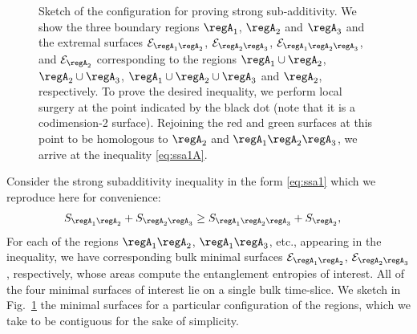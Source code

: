\documentclass[12pt,openany]{book}
\begin{document}
\begin{figure}[htbp]
\begin{center}
\end{center}
\caption{Sketch of  the configuration for proving strong sub-additivity. We show the three boundary regions $\regA_1$, $\regA_2$ and $\regA_3$  and the extremal surfaces ${\cal E}_{\regA_1 \regA_2}$, ${\cal E}_{\regA_2 \regA_3}$,
${\cal E}_{\regA_1 \regA_2 \regA_3}$, and ${\cal E}_{\regA_2}$
corresponding to the regions $\regA_1\cup \regA_2$, $\regA_2\cup \regA_3$, $\regA_1\cup \regA_2 \cup\regA_3$ and $\regA_2$, respectively. To prove the desired inequality, we perform local surgery at the point indicated by the black dot (note that it is a codimension-2 surface). Rejoining the red and green surfaces at this point to be homologous to $\regA_2$ and $\regA_1 \regA_2 \regA_3$, we arrive at the inequality \eqref{eq:ssa1A}.
 }
 \label{f:ssaproof}
\end{figure}
%

Consider the strong subadditivity inequality in the form \eqref{eq:ssa1} which we reproduce here for convenience:
%
\begin{align}
 S_{\regA_1 \regA_2}+S_{\regA_2 \regA_3}  & \geq S_{\regA_1 \regA_2 \regA_3}+ S_{\regA_2},
 \label{eq:ssa1A}
 \end{align}
 For each of the regions $\regA_1 \regA_2$, $\regA_1\regA_3$, etc., appearing in the inequality, we have corresponding bulk minimal surfaces ${\cal E}_{\regA_1\regA_2}$,  ${\cal E}_{\regA_2\regA_3}$, respectively, whose areas compute the entanglement entropies of interest. All of the four minimal surfaces of interest lie on a single bulk time-slice. We sketch in Fig.~\ref{f:ssaproof} the minimal surfaces  for a particular configuration of the regions, which we take to be contiguous for the sake of simplicity.
\end{document}
